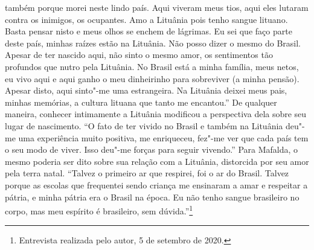 também porque morei neste lindo país. Aqui viveram meus tios, aqui eles
lutaram contra os inimigos, os ocupantes. Amo a Lituânia pois tenho
sangue lituano. Basta pensar nisto e meus olhos se enchem de lágrimas.
Eu sei que faço parte deste país, minhas raízes estão na Lituânia. Não
posso dizer o mesmo do Brasil. Apesar de ter nascido aqui, não sinto o
mesmo amor, os sentimentos tão profundos que nutro pela Lituânia. No
Brasil está a minha família, meus netos, eu vivo aqui e aqui ganho o meu
dinheirinho para sobreviver (a minha pensão). Apesar disto, aqui
sinto"-me uma estrangeira. Na Lituânia deixei meus pais, minhas memórias,
a cultura lituana que tanto me encantou.'' De qualquer maneira, conhecer
intimamente a Lituânia modificou a perspectiva dela sobre seu lugar de
nascimento. ``O fato de ter vivido no Brasil e também na Lituânia deu"-me
uma experiência muito positiva, me enriqueceu, fez"-me ver que cada país
tem o seu modo de viver. Isso deu"-me forças para seguir vivendo.'' Para
Mafalda, o mesmo poderia ser dito sobre sua relação com a Lituânia,
distorcida por seu amor pela terra natal. ``Talvez o primeiro ar que
respirei, foi o ar do Brasil. Talvez porque as escolas que frequentei
sendo criança me ensinaram a amar e respeitar a pátria, e minha pátria
era o Brasil na época. Eu não tenho sangue brasileiro no corpo, mas meu
espírito é brasileiro, sem dúvida.''\footnote{Entrevista realizada pelo
  autor, 5 de setembro de 2020.}

